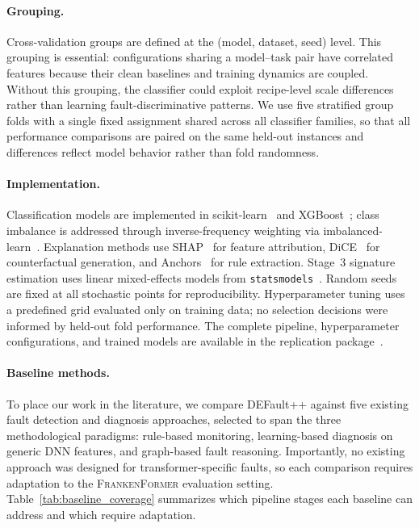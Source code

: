 \paragraph{Grouping.}
Cross-validation groups are defined at the (model, dataset, seed) level. This grouping is essential: configurations sharing a model--task pair have correlated features because their clean baselines and training dynamics are coupled. Without this grouping, the classifier could exploit recipe-level scale differences rather than learning fault-discriminative patterns. We use five stratified group folds with a single fixed assignment shared across all classifier families, so that all performance comparisons are paired on the same held-out instances and differences reflect model behavior rather than fold randomness.

\paragraph{Implementation.}
Classification models are implemented in scikit-learn~\cite{pedregosa2011scikit} and XGBoost~\cite{chen2016xgboost}; class imbalance is addressed through inverse-frequency weighting via imbalanced-learn~\cite{lemaitre2017imbalanced}. Explanation methods use SHAP~\cite{lundberg2017unified} for feature attribution, DiCE~\cite{mothilal2020dice} for counterfactual generation, and Anchors~\cite{ribeiro2018anchors} for rule extraction. Stage~3 signature estimation uses linear mixed-effects models from \texttt{statsmodels}~\cite{statsmodels}. Random seeds are fixed at all stochastic points for reproducibility. Hyperparameter tuning uses a predefined grid evaluated only on training data; no selection decisions were informed by held-out fold performance. The complete pipeline, hyperparameter configurations, and trained models are available in the replication package~\cite{defaultpp_repo}.

\paragraph{Baseline methods.}
To place our work in the literature, we compare DEFault++ against five existing fault detection and diagnosis approaches, selected to span the three methodological paradigms: rule-based monitoring, learning-based diagnosis on generic DNN features, and graph-based fault reasoning. Importantly, no existing approach was designed for transformer-specific faults, so each comparison requires adaptation to the \textsc{FrankenFormer} evaluation setting. Table~\ref{tab:baseline_coverage} summarizes which pipeline stages each baseline can address and which require adaptation.

